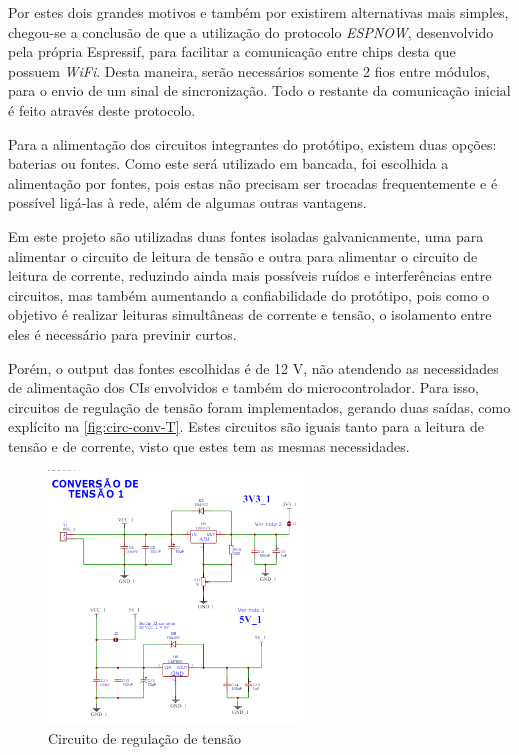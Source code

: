 Por estes dois grandes motivos e também por existirem alternativas mais simples, chegou-se a conclusão de que a utilização do protocolo \textit{ESPNOW}, desenvolvido pela própria Espressif, para facilitar a comunicação entre chips desta que possuem \textit{WiFi}. Desta maneira, serão necessários somente 2 fios entre módulos, para o envio de um sinal de sincronização. Todo o restante da comunicação inicial é feito através deste protocolo.

Para a alimentação dos circuitos integrantes do protótipo, existem duas opções: baterias ou fontes. Como este será utilizado em bancada, foi escolhida a alimentação por fontes, pois estas não precisam ser trocadas frequentemente e é possível ligá-las à rede, além de algumas outras vantagens.

Em este projeto são utilizadas duas fontes isoladas galvanicamente, uma para alimentar o circuito de leitura de tensão e outra para alimentar o circuito de leitura de corrente, reduzindo ainda mais possíveis ruídos e interferências entre circuitos, mas também aumentando a confiabilidade do protótipo, pois como o objetivo é realizar leituras simultâneas de corrente e tensão, o isolamento entre eles é necessário para previnir curtos.

Porém, o output das fontes escolhidas é de 12 V, não atendendo as necessidades de alimentação dos \gls{CI}s envolvidos e também do microcontrolador. Para isso, circuitos de regulação de tensão foram implementados, gerando duas saídas, como explícito na \autoref{fig:circ-conv-T}. Estes circuitos são iguais tanto para a leitura de tensão e de corrente, visto que estes tem as mesmas necessidades.

\begin{figure}[htb!]
    \caption{Circuito de regulação de tensão}
    \label{fig:circ-conv-T}
    \includegraphics[width=0.6\textwidth]{figuras/circ-conv-T.png}
    \fonte{}
\end{figure}

